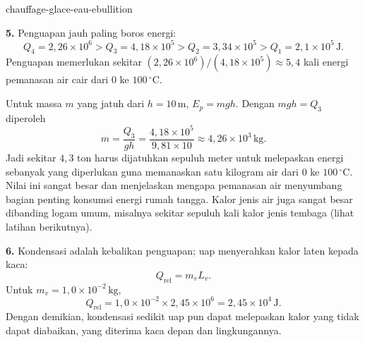 \begin{exo}{chauffage-glace-eau-ebullition}
\begin{solution}
\textbf{5.} Penguapan jauh paling boros energi:
\[
Q_4=2{,}26\times10^6>Q_3=4{,}18\times10^5>Q_2=3{,}34\times10^5>Q_1=2{,}1\times10^5\,\text{J}.
\]
Penguapan memerlukan sekitar $(2{,}26\times10^6)/(4{,}18\times10^5)\approx5{,}4$ kali energi pemanasan air cair dari $0$ ke $100\,{}^\circ\text{C}$.

Untuk massa $m$ yang jatuh dari $h=10\,\text{m}$, $E_p=mgh$. Dengan $mgh=Q_3$ diperoleh
\[
m=\frac{Q_3}{gh}=\frac{4{,}18\times10^5}{9{,}81\times10}
\approx4{,}26\times10^3\,\text{kg}.
\]
Jadi sekitar $4{,}3$ ton harus dijatuhkan sepuluh meter untuk melepaskan energi sebanyak yang diperlukan guna memanaskan satu kilogram air dari $0$ ke $100\,{}^\circ\text{C}$. Nilai ini sangat besar dan menjelaskan mengapa pemanasan air menyumbang bagian penting konsumsi energi rumah tangga. Kalor jenis air juga sangat besar dibanding logam umum, misalnya sekitar sepuluh kali kalor jenis tembaga (lihat latihan berikutnya).

\textbf{6.} Kondensasi adalah kebalikan penguapan; uap menyerahkan kalor laten kepada kaca:
\[
Q_{\text{rel}}=m_vL_v.
\]
Untuk $m_v=1{,}0\times10^{-2}\,\text{kg}$,
\[
Q_{\text{rel}}=1{,}0\times10^{-2}\times2{,}45\times10^6
=2{,}45\times10^4\,\text{J}.
\]
Dengan demikian, kondensasi sedikit uap pun dapat melepaskan kalor yang tidak dapat diabaikan, yang diterima kaca depan dan lingkungannya.
\end{solution}
\end{exo}

